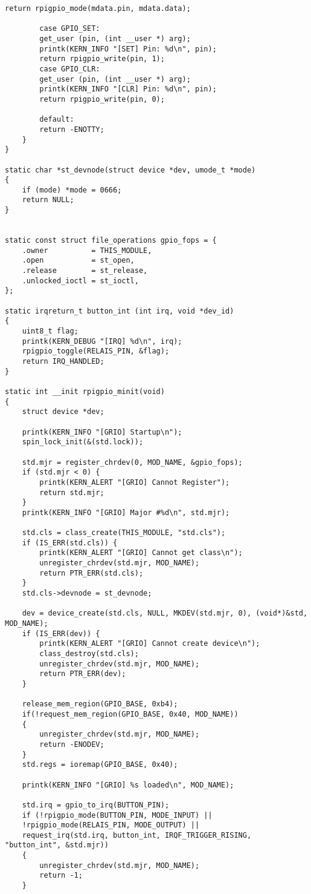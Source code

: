 \begin{lstlisting}[caption = {modgpio.c}, label=lst:modgpio.c]
		return rpigpio_mode(mdata.pin, mdata.data);
		
		case GPIO_SET:
		get_user (pin, (int __user *) arg);
		printk(KERN_INFO "[SET] Pin: %d\n", pin);
		return rpigpio_write(pin, 1);
		case GPIO_CLR:
		get_user (pin, (int __user *) arg);
		printk(KERN_INFO "[CLR] Pin: %d\n", pin);
		return rpigpio_write(pin, 0);
		
		default:
		return -ENOTTY;
	}
}

static char *st_devnode(struct device *dev, umode_t *mode)
{
	if (mode) *mode = 0666;
	return NULL;
}


static const struct file_operations gpio_fops = {
	.owner			= THIS_MODULE,
	.open			= st_open,
	.release 		= st_release,
	.unlocked_ioctl = st_ioctl,
};

static irqreturn_t button_int (int irq, void *dev_id)
{
	uint8_t flag;
	printk(KERN_DEBUG "[IRQ] %d\n", irq);
	rpigpio_toggle(RELAIS_PIN, &flag);
	return IRQ_HANDLED;
}

static int __init rpigpio_minit(void)
{
	struct device *dev;
	
	printk(KERN_INFO "[GRIO] Startup\n");
	spin_lock_init(&(std.lock));
	
	std.mjr = register_chrdev(0, MOD_NAME, &gpio_fops);
	if (std.mjr < 0) {
		printk(KERN_ALERT "[GRIO] Cannot Register");
		return std.mjr;
	}
	printk(KERN_INFO "[GRIO] Major #%d\n", std.mjr);
	
	std.cls = class_create(THIS_MODULE, "std.cls");
	if (IS_ERR(std.cls)) {
		printk(KERN_ALERT "[GRIO] Cannot get class\n");
		unregister_chrdev(std.mjr, MOD_NAME);
		return PTR_ERR(std.cls);
	}
	std.cls->devnode = st_devnode;
	
	dev = device_create(std.cls, NULL, MKDEV(std.mjr, 0), (void*)&std, MOD_NAME);
	if (IS_ERR(dev)) {
		printk(KERN_ALERT "[GRIO] Cannot create device\n");
		class_destroy(std.cls);
		unregister_chrdev(std.mjr, MOD_NAME);
		return PTR_ERR(dev);
	}
	
	release_mem_region(GPIO_BASE, 0xb4);
	if(!request_mem_region(GPIO_BASE, 0x40, MOD_NAME))
	{
		unregister_chrdev(std.mjr, MOD_NAME);
		return -ENODEV;
	}
	std.regs = ioremap(GPIO_BASE, 0x40);
	
	printk(KERN_INFO "[GRIO] %s loaded\n", MOD_NAME);
	
	std.irq = gpio_to_irq(BUTTON_PIN);
	if (!rpigpio_mode(BUTTON_PIN, MODE_INPUT) ||
	!rpigpio_mode(RELAIS_PIN, MODE_OUTPUT) ||
	request_irq(std.irq, button_int, IRQF_TRIGGER_RISING, "button_int", &std.mjr))
	{
		unregister_chrdev(std.mjr, MOD_NAME);
		return -1;
	}
	

\end{lstlisting}
